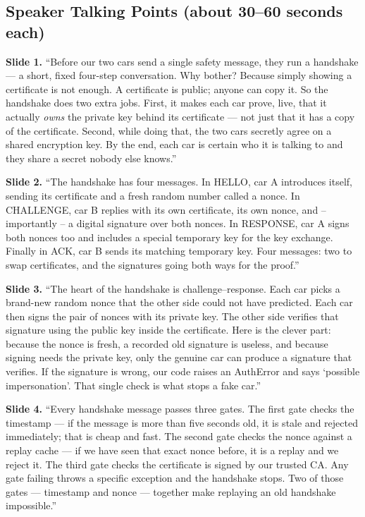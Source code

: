 \documentclass[11pt,a4paper]{report}
\begin{document}
\subsection{Speaker Talking Points (about 30--60 seconds each)}

\textbf{Slide 1.} ``Before our two cars send a single safety message, they run a
handshake --- a short, fixed four-step conversation. Why bother? Because simply
showing a certificate is not enough. A certificate is public; anyone can copy it.
So the handshake does two extra jobs. First, it makes each car prove, live, that
it actually \emph{owns} the private key behind its certificate --- not just that
it has a copy of the certificate. Second, while doing that, the two cars secretly
agree on a shared encryption key. By the end, each car is certain who it is
talking to and they share a secret nobody else knows.''

\textbf{Slide 2.} ``The handshake has four messages. In HELLO, car A introduces
itself, sending its certificate and a fresh random number called a nonce. In
CHALLENGE, car B replies with its own certificate, its own nonce, and --
importantly -- a digital signature over both nonces. In RESPONSE, car A signs
both nonces too and includes a special temporary key for the key exchange.
Finally in ACK, car B sends its matching temporary key. Four messages: two to
swap certificates, and the signatures going both ways for the proof.''

\textbf{Slide 3.} ``The heart of the handshake is challenge--response. Each car
picks a brand-new random nonce that the other side could not have predicted. Each
car then signs the pair of nonces with its private key. The other side verifies
that signature using the public key inside the certificate. Here is the clever
part: because the nonce is fresh, a recorded old signature is useless, and
because signing needs the private key, only the genuine car can produce a
signature that verifies. If the signature is wrong, our code raises an AuthError
and says `possible impersonation'. That single check is what stops a fake car.''

\textbf{Slide 4.} ``Every handshake message passes three gates. The first gate
checks the timestamp --- if the message is more than five seconds old, it is
stale and rejected immediately; that is cheap and fast. The second gate checks
the nonce against a replay cache --- if we have seen that exact nonce before, it
is a replay and we reject it. The third gate checks the certificate is signed by
our trusted CA. Any gate failing throws a specific exception and the handshake
stops. Two of those gates --- timestamp and nonce --- together make replaying an
old handshake impossible.''
\end{document}
